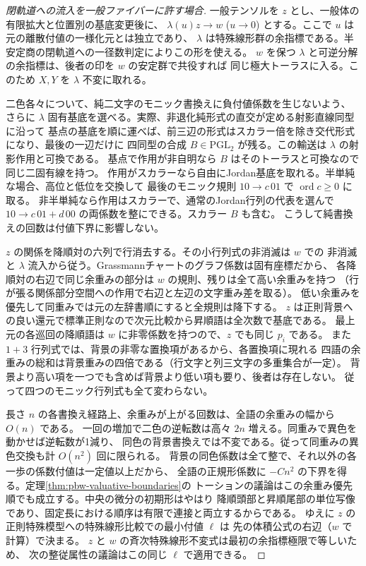 \begin{proof}[閉軌道への流入を一般ファイバーに許す場合]
一般テンソルを $z$ とし、一般体の有限拡大と位置別の基底変更後に、
$\lambda(u)z\to w$ ($u\to0$) とする。ここで $u$ は元の離散付値の一様化元とは独立であり、
$\lambda$ は特殊線形群の余指標である。半安定商の閉軌道への一径数判定によりこの形を使える。
$w$ を保つ $\lambda$ と可逆分解の余指標は、後者の印を $w$ の安定群で共役すれば
同じ極大トーラスに入る。このため $X,Y$ を $\lambda$ 不変に取れる。

二色各々について、純二文字のモニック書換えに負付値係数を生じないよう、
さらに $\lambda$ 固有基底を選べる。実際、非退化純形式の直交が定める射影直線同型に沿って
基点の基底を順に運べば、前三辺の形式はスカラー倍を除き交代形式になり、最後の一辺だけに
四同型の合成 $B\in\mathrm{PGL}_2$ が残る。この輸送は $\lambda$ の射影作用と可換である。
基点で作用が非自明なら $B$ はそのトーラスと可換なので同じ二固有線を持つ。
作用がスカラーなら自由にJordan基底を取れる。半単純な場合、高位と低位を交換して
最後のモニック規則 $10\to c\,01$ で $\operatorname{ord} c\ge0$ に取る。
非半単純なら作用はスカラーで、通常のJordan行列の代表を選んで
$10\to c\,01+d\,00$ の両係数を整にできる。スカラー $B$ も含む。
こうして純書換えの回数は付値下界に影響しない。

$z$ の関係を降順対の六列で行消去する。その小行列式の非消滅は $w$ での
非消滅と $\lambda$ 流入から従う。Grassmannチャートのグラフ係数は固有座標だから、
各降順対の右辺で同じ余重みの部分は $w$ の規則、残りは全て高い余重みを持つ
（行が張る関係部分空間への作用で右辺と左辺の文字重み差を取る）。
低い余重みを優先して同重みでは元の左辞書順にすると全規則は降下する。
$z$ は正則背景への良い還元で標準正則なので次元比較から昇順語は全次数で基底である。
最上元の各巡回の降順語は $w$ に非零係数を持つので、$z$ でも同じ $p_i$ である。
また $1+3$ 行列式では、背景の非零な置換項があるから、各置換項に現れる
四語の余重みの総和は背景重みの四倍である（行文字と列三文字の多重集合が一定）。
背景より高い項を一つでも含めば背景より低い項も要り、後者は存在しない。
従って四つのモニック行列式も全て変わらない。

長さ $n$ の各書換え経路上、余重みが上がる回数は、全語の余重みの幅から $O(n)$ である。
一回の増加で二色の逆転数は高々 $2n$ 増える。同重みで異色を動かせば逆転数が1減り、
同色の背景書換えでは不変である。従って同重みの異色交換も計 $O(n^2)$ 回に限られる。
背景の同色係数は全て整で、それ以外の各一歩の係数付値は一定値以上だから、
全語の正規形係数に $-Cn^2$ の下界を得る。定理\ref{thm:pbw-valuative-boundaries}の
トーションの議論はこの余重み優先順でも成立する。中央の微分の初期形はやはり
降順頭部と昇順尾部の単位写像であり、固定長における順序は有限で連接と両立するからである。
ゆえに $z$ の正則特殊模型への特殊線形比較での最小付値 $\ell$ は
先の体積公式の右辺（$w$ で計算）で決まる。
$z$ と $w$ の斉次特殊線形不変式は最初の余指標極限で等しいため、
次の整従属性の議論はこの同じ $\ell$ で適用できる。
\end{proof}
